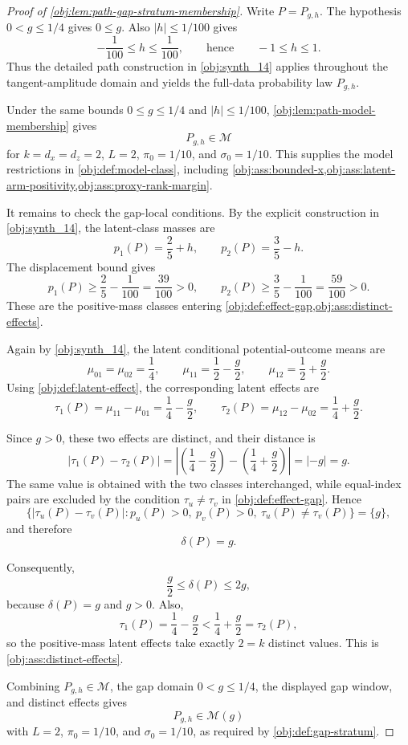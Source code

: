 \documentclass[11pt]{article}
\begin{document}
\begin{proof}[Proof of \cref{obj:lem:path-gap-stratum-membership}]
Write \(P=P_{g,h}\).  The hypothesis \(0<g\le 1/4\) gives \(0\le g\).  Also \(|h|\le 1/100\) gives
\[
-\frac1{100}\le h\le \frac1{100},
\qquad\text{hence}\qquad
-1\le h\le 1 .
\]
Thus the detailed path construction in \cref{obj:synth_14} applies throughout the tangent-amplitude domain and yields the full-data probability law \(P_{g,h}\). %

Under the same bounds \(0\le g\le 1/4\) and \(|h|\le1/100\), \cref{obj:lem:path-model-membership} gives
\[
P_{g,h}\in\mathcal M
\]
for \(k=d_x=d_z=2\), \(L=2\), \(\pi_0=1/10\), and \(\sigma_0=1/10\).  This supplies the model restrictions in \cref{obj:def:model-class}, including \cref{obj:ass:bounded-x,obj:ass:latent-arm-positivity,obj:ass:proxy-rank-margin}. %

It remains to check the gap-local conditions.  By the explicit construction in \cref{obj:synth_14}, the latent-class masses are
\[
p_1(P)=\frac25+h,
\qquad
p_2(P)=\frac35-h .
\]
The displacement bound gives
\[
p_1(P)\ge \frac25-\frac1{100}=\frac{39}{100}>0,
\qquad
p_2(P)\ge \frac35-\frac1{100}=\frac{59}{100}>0 .
\]
These are the positive-mass classes entering \cref{obj:def:effect-gap,obj:ass:distinct-effects}. %

Again by \cref{obj:synth_14}, the latent conditional potential-outcome means are
\[
\mu_{01}=\mu_{02}=\frac14,
\qquad
\mu_{11}=\frac12-\frac g2,
\qquad
\mu_{12}=\frac12+\frac g2 .
\]
Using \cref{obj:def:latent-effect}, the corresponding latent effects are
\[
\tau_1(P)=\mu_{11}-\mu_{01}
=\frac14-\frac g2,
\qquad
\tau_2(P)=\mu_{12}-\mu_{02}
=\frac14+\frac g2 .
\]

Since \(g>0\), these two effects are distinct, and their distance is
\[
|\tau_1(P)-\tau_2(P)|
=
\left|
\left(\frac14-\frac g2\right)
-
\left(\frac14+\frac g2\right)
\right|
=
|-g|
=
g .
\]
The same value is obtained with the two classes interchanged, while equal-index pairs are excluded by the condition \(\tau_u\ne\tau_v\) in \cref{obj:def:effect-gap}.  Hence
\[
\bigl\{|\tau_u(P)-\tau_v(P)|:
p_u(P)>0,\ p_v(P)>0,\ \tau_u(P)\ne\tau_v(P)\bigr\}
=
\{g\},
\]
and therefore
\[
\delta(P)=g .
\]

Consequently,
\[
\frac g2\le \delta(P)\le 2g,
\]
because \(\delta(P)=g\) and \(g>0\).  Also,
\[
\tau_1(P)=\frac14-\frac g2
<
\frac14+\frac g2
=\tau_2(P),
\]
so the positive-mass latent effects take exactly \(2=k\) distinct values.  This is \cref{obj:ass:distinct-effects}. %

Combining \(P_{g,h}\in\mathcal M\), the gap domain \(0<g\le1/4\), the displayed gap window, and distinct effects gives
\[
P_{g,h}\in\mathcal M(g)
\]
with \(L=2\), \(\pi_0=1/10\), and \(\sigma_0=1/10\), as required by \cref{obj:def:gap-stratum}. %
\end{proof}
\end{document}
